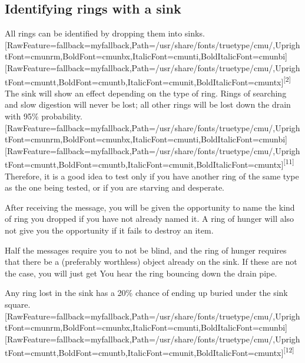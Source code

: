 \subsection{Identifying rings with a sink}
\label{4}
All rings\footnotemark[71] can be identified by dropping them into sinks.\allowbreak{}\setmainfont{cmunrm.ttf}[RawFeature={fallback=myfallback},Path=/usr/share/fonts/truetype/cmu/,UprightFont=cmunrm,BoldFont=cmunbx,ItalicFont=cmunti,BoldItalicFont=cmunbi]\setmonofont{cmunrm.ttf}[RawFeature={fallback=myfallback},Path=/usr/share/fonts/truetype/cmu/,UprightFont=cmuntt,BoldFont=cmuntb,ItalicFont=cmunit,BoldItalicFont=cmuntx]\textsuperscript{{$\text{[}$}2{$\text{]}$}} The sink will show an effect depending on the type of ring. Rings of searching and slow digestion will never be lost; all other rings will be lost down the drain with 95\% probability.\allowbreak{}\setmainfont{cmunrm.ttf}[RawFeature={fallback=myfallback},Path=/usr/share/fonts/truetype/cmu/,UprightFont=cmunrm,BoldFont=cmunbx,ItalicFont=cmunti,BoldItalicFont=cmunbi]\setmonofont{cmunrm.ttf}[RawFeature={fallback=myfallback},Path=/usr/share/fonts/truetype/cmu/,UprightFont=cmuntt,BoldFont=cmuntb,ItalicFont=cmunit,BoldItalicFont=cmuntx]\textsuperscript{{$\text{[}$}11{$\text{]}$}} Therefore, it is a good idea to test only if you have another ring of the same type as the one being tested, or if you are starving and desperate.


After receiving the message, you will be given the opportunity to name the kind of ring you dropped if you have not already named it. A ring of hunger will also not give you the opportunity if it fails to destroy an item.


Half the messages require you to not be blind\footnotemark[72], and the ring of hunger requires that there be a (preferably worthless) object already on the sink. If these are not the case, you will just get You hear the ring bouncing down the drain pipe.


Any ring lost in the sink has a 20\% chance of ending up buried\footnotemark[73] under the sink square.\allowbreak{}\setmainfont{cmunrm.ttf}[RawFeature={fallback=myfallback},Path=/usr/share/fonts/truetype/cmu/,UprightFont=cmunrm,BoldFont=cmunbx,ItalicFont=cmunti,BoldItalicFont=cmunbi]\setmonofont{cmunrm.ttf}[RawFeature={fallback=myfallback},Path=/usr/share/fonts/truetype/cmu/,UprightFont=cmuntt,BoldFont=cmuntb,ItalicFont=cmunit,BoldItalicFont=cmuntx]\textsuperscript{{$\text{[}$}12{$\text{]}$}}




